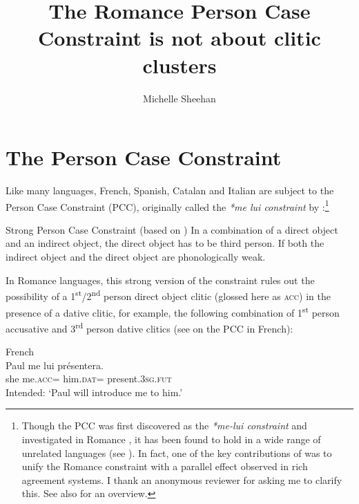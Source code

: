 \documentclass[output=paper,colorlinks,citecolor=brown,nonflat]{./langscibook}
\author{Michelle Sheehan	\affiliation{Anglia Ruskin University}}
\title{The Romance Person Case Constraint is not about clitic clusters}
\begin{document}
\maketitle 

\section{The Person Case Constraint}\label{sec:sheehan:1}

Like many languages, French, Spanish, Catalan and Italian are subject to the Person Case Constraint (PCC), originally called the \textit{*me lui constraint} by \citet{Perlmutter1971}:\footnote{Though the PCC was first discovered as the \textit{*me-lui constraint} and investigated in Romance \citep{Perlmutter1971}, it has been found to hold in a wide range of unrelated languages (see \citealt{Bonet1991, Albizu1997, Rezac2008, Haspelmath2004, AdgerHarbour2007}). In fact, one of the key contributions of \citet{Bonet1991} was to unify the Romance constraint with a parallel effect observed in rich agreement systems. I thank an anonymous reviewer for asking me to clarify this. See also \citet{Bonet2007} for an overview.} 

\ea%
    \label{ex:sheehan:1}
    Strong Person Case Constraint (based on \citealt[181-182]{Bonet1991})
    \ea\label{ex:sheehan:1a}
    In a combination of a direct object and an indirect object, the direct object has to be third person.
    \ex\label{ex:sheehan:1b}
    If both the indirect object and the direct object are phonologically weak.
    \z
\z

In Romance languages, this strong version of the constraint rules out the possibility of a 1\textsuperscript{st}/2\textsuperscript{nd} person direct object clitic (glossed here as \textsc{acc}) in the presence of a dative clitic, for example, the following combination of 1\textsuperscript{st} person accusative and 3\textsuperscript{rd} person dative clitics (see \citealt{Perlmutter1971, Kayne1975, Postal1981} on the PCC in French):

\ea%
    \label{ex:sheehan:2}
    French \citep[173]{Kayne1975}\\
    \gll    *Paul   me       lui       présentera.\\
            she   me.\textsc{acc}=   him.\textsc{dat=} present.\textsc{3sg.fut}\\
    \glt    Intended: ‘Paul will introduce me to him.’
\z
\end{document}
